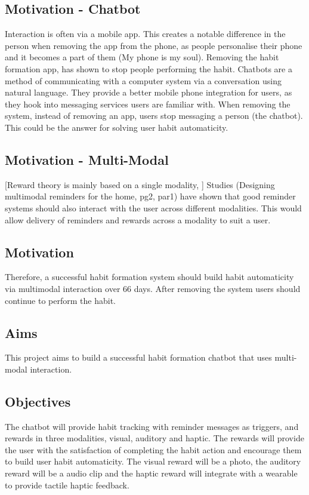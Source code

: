 \subsection*{Motivation - Chatbot}
Interaction is often via a mobile app. This creates a notable difference in the person when removing the app from the phone, as people personalise their phone and it becomes a part of them (My phone is my soul). Removing the habit formation app, has shown to stop people performing the habit. Chatbots are a method of communicating with a computer system via a conversation using natural language. They provide a better mobile phone integration for users, as they hook into messaging services users are familiar with. When removing the system, instead of removing an app, users stop messaging a person (the chatbot). This could be the answer for solving user habit automaticity.

\subsection*{Motivation - Multi-Modal}
[Reward theory is mainly based on a single modality, ]
Studies (Designing multimodal reminders for the home, pg2, par1) have shown that good reminder systems should also interact with the user across different modalities. This would allow delivery of reminders and rewards across a modality to suit a user.

\subsection*{Motivation}
Therefore, a successful habit formation system should build habit automaticity via multimodal interaction over 66 days. After removing the system users should continue to perform the habit.

\subsection*{Aims}
This project aims to build a successful habit formation chatbot that uses multi-modal interaction.

\subsection*{Objectives}
The chatbot will provide habit tracking with reminder messages as triggers, and rewards in three modalities, visual, auditory and haptic.\newline
\newline
The rewards will provide the user with the satisfaction of completing the habit action and encourage them to build user habit automaticity. The visual reward will be a photo, the auditory reward will be a audio clip and the haptic reward will integrate with a wearable to provide tactile haptic feedback.

